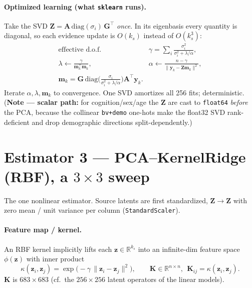 \documentclass[11pt]{article}
\newcommand{\code}[1]{\texttt{#1}}
\newcommand{\R}{\mathbb{R}}
\newcommand{\T}{^{\!\top}}
\newcommand{\Z}{\mathbf{Z}}
\newcommand{\norm}[1]{\lVert #1 \rVert}
\begin{document}
\paragraph{Optimized learning (what \code{sklearn} runs).} Take the SVD
$\Z=\mathbf A\,\mathrm{diag}(\sigma_i)\,\mathbf G\T$ \emph{once}. In its eigenbasis every quantity
is diagonal, so each evidence update is $O(k_s)$ instead of $O(k_s^3)$:
\begin{align*}
  \text{effective d.o.f.}\quad & \gamma=\sum_{i}\frac{\sigma_i^2}{\sigma_i^2+\lambda/\alpha},\\
  \lambda\leftarrow\frac{\gamma}{\mathbf m_k\T\mathbf m_k},\qquad
  & \alpha\leftarrow\frac{n-\gamma}{\norm{\mathbf y_k-\Z\mathbf m_k}^2},\\
  \mathbf m_k=\mathbf G\,\mathrm{diag}\!\Big(\tfrac{\sigma_i}{\sigma_i^2+\lambda/\alpha}\Big)\mathbf A\T\mathbf y_k. &
\end{align*}
Iterate $\alpha,\lambda,\mathbf m_k$ to convergence. One SVD amortizes all 256 fits;
deterministic. (\textbf{Note --- scalar path:} for cognition/sex/age the $\Z$ are cast to
\code{float64} \emph{before} the PCA, because the collinear \code{bv+demo} one-hots make the
float32 SVD rank-deficient and drop demographic directions split-dependently.)

\section{Estimator 3 --- PCA--KernelRidge (RBF), a $3\times3$ sweep}\label{sec:kr}

The one nonlinear estimator. Source latents are first standardized,
$\Z\!\to\!\Z$ with zero mean / unit variance per column (\code{StandardScaler}).

\paragraph{Feature map / kernel.} An RBF kernel implicitly lifts each $\mathbf z\in\R^{k_s}$ into an
infinite-dim feature space $\phi(\mathbf z)$ with inner product
\[
  \kappa(\mathbf z_i,\mathbf z_j)=\exp\!\big(-\gamma\,\norm{\mathbf z_i-\mathbf z_j}^2\big),\qquad
  \mathbf K\in\R^{n\times n},\ \ \mathbf K_{ij}=\kappa(\mathbf z_i,\mathbf z_j).
\]
$\mathbf K$ is $683\times683$ (cf.\ the $256\times256$ latent operators of the linear models).
\end{document}
